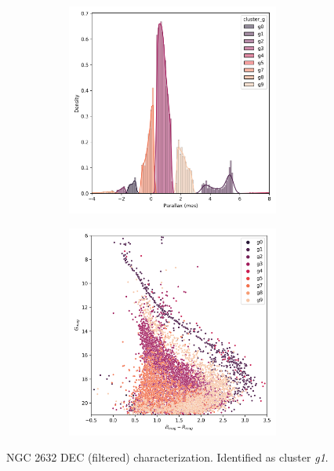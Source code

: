 \documentclass[11pt, a4paper, english]{book}
\begin{document}
\begin{figure}[H]
\begin{subfigure}{0.9\textwidth}
\begin{subfigure}[t]{0.30\textwidth}
    \end{subfigure}
    \hfill
    \begin{subfigure}[t]{0.30\textwidth}
      \centering
      \includegraphics[width=\textwidth]{../figures/ngc_2632/dec_parallax_filtered_ngc_2632.png}
    \end{subfigure}
    \hfill
    \begin{subfigure}[t]{0.30\textwidth}
      \centering
      \includegraphics[width=\textwidth]{../figures/ngc_2632/dec_hr_diagram_filtered_ngc_2632.png}
    \end{subfigure}
  \end{subfigure}
  \caption{NGC 2632 DEC (filtered) characterization. Identified as cluster \emph{g1}.}
  \label{fig:result_ngc_2632_dec_filtered}
\end{figure}
\end{document}

